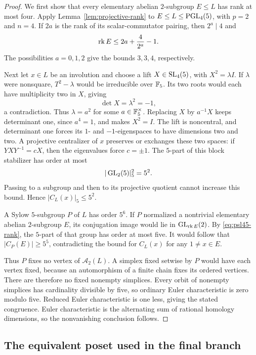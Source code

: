 \begin{proof}
We first show that every elementary abelian $2$-subgroup $E\leq L$
has rank at most four. Apply Lemma~\ref{lem:projective-rank} to
$E\leq L\leq\operatorname{PGL}_4(5)$, with $p=2$ and $n=4$. If $2a$ is the
rank of its scalar-commutator pairing, then $2^a\mid4$ and
\begin{equation}\label{eq:psl45-rank}
 \operatorname{rk} E\leq2a+\frac4{2^a}-1.
\end{equation}
The possibilities $a=0,1,2$ give the bounds $3,3,4$, respectively.

Next let $x\in L$ be an involution and choose a lift
$X\in\operatorname{SL}_4(5)$, with $X^2=\lambda I$.
If $\lambda$ were nonsquare, $T^2-\lambda$ would be irreducible
over $\mathbb F_5$. Its two roots would each have multiplicity two in
$X$, giving
\[
 \det X=\lambda^2=-1,
\]
a contradiction. Thus $\lambda=a^2$ for some $a\in\mathbb F_5^\times$.
Replacing $X$ by $a^{-1}X$ keeps determinant one, since $a^4=1$,
and makes $X^2=I$. The lift is noncentral, and determinant one
forces its $1$- and $-1$-eigenspaces to have dimensions two and two.
A projective centralizer of $x$ preserves or exchanges these two
spaces: if $YXY^{-1}=cX$, then the eigenvalues force $c=\pm1$.
The $5$-part of this block stabilizer has order at most
\[
 |\operatorname{GL}_2(5)|_5^2=5^2.
\]
Passing to a subgroup and then to its projective quotient cannot
increase this bound. Hence $|C_L(x)|_5\leq5^2$.

A Sylow $5$-subgroup $P$ of $L$ has order $5^6$.
If $P$ normalized a nontrivial elementary abelian $2$-subgroup $E$,
its conjugation image would lie in $\operatorname{GL}_{\operatorname{rk} E}(2)$. By
\eqref{eq:psl45-rank}, the $5$-part of that group has order at most
five. It would follow that $|C_P(E)|\geq5^5$, contradicting the
bound for $C_L(x)$ for any $1\ne x\in E$.

Thus $P$ fixes no vertex of $\mathcal A_2(L)$. A simplex fixed
setwise by $P$ would have each vertex fixed, because an automorphism
of a finite chain fixes its ordered vertices. There are therefore
no fixed nonempty simplices. Every orbit of nonempty simplices
has cardinality divisible by five, so ordinary Euler
characteristic is zero modulo five. Reduced Euler characteristic
is one less, giving the stated congruence.
Euler characteristic is the alternating sum of rational homology
dimensions, so the nonvanishing conclusion follows.
\end{proof}

\subsection{The equivalent poset used in the final branch}

